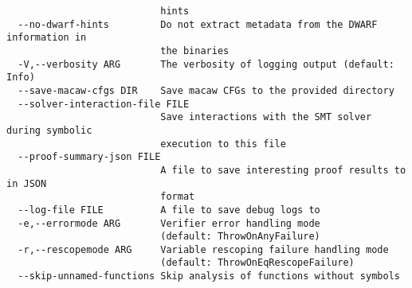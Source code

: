 \begin{verbatim}
                           hints
  --no-dwarf-hints         Do not extract metadata from the DWARF information in
                           the binaries
  -V,--verbosity ARG       The verbosity of logging output (default: Info)
  --save-macaw-cfgs DIR    Save macaw CFGs to the provided directory
  --solver-interaction-file FILE
                           Save interactions with the SMT solver during symbolic
                           execution to this file
  --proof-summary-json FILE
                           A file to save interesting proof results to in JSON
                           format
  --log-file FILE          A file to save debug logs to
  -e,--errormode ARG       Verifier error handling mode
                           (default: ThrowOnAnyFailure)
  -r,--rescopemode ARG     Variable rescoping failure handling mode
                           (default: ThrowOnEqRescopeFailure)
  --skip-unnamed-functions Skip analysis of functions without symbols
\end{verbatim}


